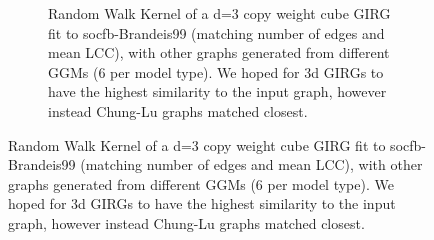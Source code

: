 \begin{figure}
\begin{subfigure}{0.49 \textwidth}
    \caption{Random Walk Kernel of a d=3 copy weight cube GIRG fit to socfb-Brandeis99 (matching number of edges and mean LCC), with other graphs generated from different GGMs (6 per model type). We hoped for 3d GIRGs to have the highest similarity to the input graph, however instead Chung-Lu graphs matched closest.}
    \label{fig:rw_kernel_fitcopycube}
  \end{subfigure}
\end{figure}











